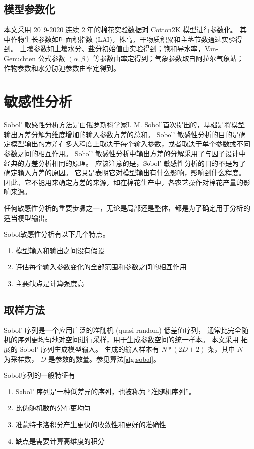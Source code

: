 \subsection{模型参数化}
本文采用 2019-2020 连续 2 年的棉花实验数据对 Cotton2K 模型进行参数化。
其中作物生长参数如叶面积指数 (LAI)，株高，干物质积累和主茎节数通过实验得到。
土壤参数如土壤水分、盐分初始值由实验得到；饱和导水率，Van-Genuchten
公式参数 $(\alpha, \beta)$ 等参数由率定得到；气象参数取自阿拉尔气象站；
作物参数和水分胁迫参数由率定得到。

\section{敏感性分析}
Sobol' 敏感性分析方法是由俄罗斯科学家I. M. Sobol'首次提出的\cite{sobol2001}，基础是将模型输出方差分解为维度增加的输入参数方差的总和。
Sobol' 敏感性分析的目的是确定模型输出的方差在多大程度上取决于每个输入参数，或者取决于单个参数或不同参数之间的相互作用。%
Sobol' 敏感性分析中输出方差的分解采用了与因子设计中经典的方差分析相同的原理。%
应该注意的是，Sobol' 敏感性分析的目的不是为了确定输入方差的原因。%
它只是表明它对模型输出有什么影响，影响到什么程度。%
因此，它不能用来确定方差的来源，如在棉花生产中，各农艺操作对棉花产量的影响来源。

任何敏感性分析的重要步骤之一，无论是局部还是整体，都是为了确定用于分析的适当模型输出。

Sobol敏感性分析有以下几个特点。
\begin{enumerate}
    \item 模型输入和输出之间没有假设
    \item 评估每个输入参数变化的全部范围和参数之间的相互作用
    \item 主要缺点是计算强度高
\end{enumerate}
\subsection{取样方法}
Sobol' 序列是一个应用广泛的准随机 (quasi-random) 低差值序列，%
通常比完全随机的序列更均匀地对空间进行采样，用于生成参数空间的统一样本。%
本文采用  拓展的 Sobol' 序列生成模型输入。%
生成的输入样本有 $N * (2D + 2)$ 条，其中 $N$ 为采样数， $D$ 是参数的数量。参见算法\ref{alg:sobol}。

Sobol序列的一般特征有
\begin{enumerate}
    \item Sobol' 序列是一种低差异的序列，也被称为 “准随机序列”。
    \item 比伪随机数的分布更均匀
    \item 准蒙特卡洛积分产生更快的收敛性和更好的准确性
    \item 缺点是需要计算高维度的积分
\end{enumerate}

